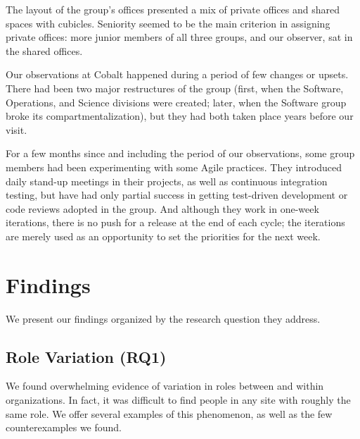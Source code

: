 \documentclass[10pt, conference, compsocconf]{IEEEtran}
\begin{document}
The layout of the group's offices presented a mix of private offices and shared spaces with cubicles. Seniority seemed to be the main criterion in assigning private offices: more junior members of all three groups, and our observer, sat in the shared offices.

Our observations at Cobalt happened during a period of few changes or upsets. There had been two major restructures of the group (first, when the Software, Operations, and Science divisions were created; later, when the Software group broke its compartmentalization), but they had both taken place years before our visit.

For a few months since and including the period of our observations, some group members had been experimenting with some Agile practices. They introduced daily stand-up meetings in their projects, as well as continuous integration testing, but have had only partial success in getting test-driven development or code reviews adopted in the group. And although they work in one-week iterations, there is no push for a release at the end of each cycle; the iterations are merely used as an opportunity to set the priorities for the next week.




\section{Findings}

We present our findings organized by the research question they address.

\subsection{Role Variation (RQ1)}

We found overwhelming evidence of variation in roles between and within organizations. In fact, it was difficult to find people in any site with roughly the same role. We offer several examples of this phenomenon, as well as the few counterexamples we found.
\end{document}
